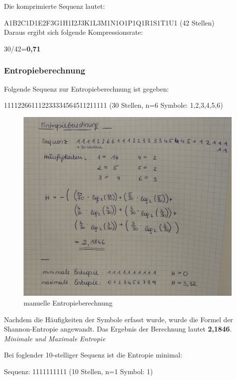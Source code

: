 \documentclass[12pt,german]{article}
\begin{document}
Die komprimierte Sequenz lautet:

A1B2C1D1E2F3G1H1I2J3K1L3M1N1O1P1Q1R1S1T1U1 (42 Stellen)\\

Daraus ergibt sich folgende Kompressionsrate:

30/42=\textbf{0,71}\\

\subsubsection{Entropieberechnung}
Folgende Sequenz zur Entropieberechnung ist gegeben:

111122661112233334564511211111 (30 Stellen, n=6 Symbole: 1,2,3,4,5,6)\\

\begin{figure}[H]
	\centering
	\includegraphics[width=12cm]{images/entropieBerechnung.jpg}
	\caption{manuelle Entropieberechnung}
	\label{fig:resultEntropie}
\end{figure}

Nachdem die Häufigkeiten der Symbole erfasst wurde, wurde die Formel der Shannon-Entropie angewandt. Das Ergebnis der Berechnung lautet \textbf{2,1846}. \\

\textit{Minimale und Maximale Entropie}

Bei foglender 10-stelliger Sequenz ist die Entropie minimal:

Sequenz: 1111111111 (10 Stellen, n=1 Symbol: 1)
\end{document}
